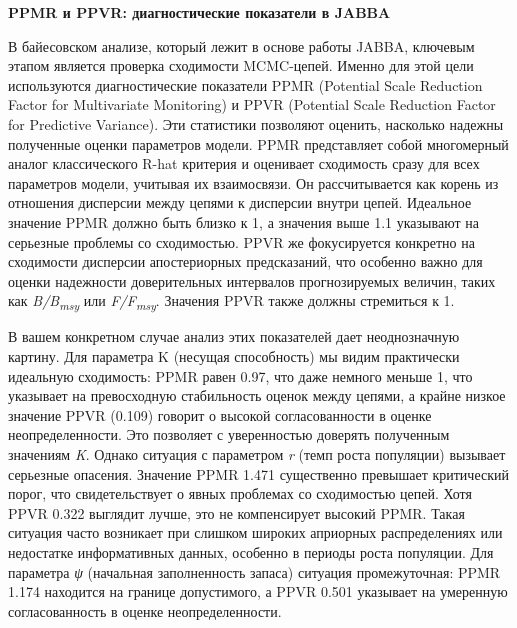 \documentclass[
  letterpaper,
  DIV=11,
  numbers=noendperiod]{scrreprt}
\begin{document}
\textbf{PPMR и PPVR: диагностические показатели в JABBA}

В байесовском анализе, который лежит в основе работы JABBA, ключевым
этапом является проверка сходимости MCMC-цепей. Именно для этой цели
используются диагностические показатели PPMR (Potential Scale Reduction
Factor for Multivariate Monitoring) и PPVR (Potential Scale Reduction
Factor for Predictive Variance). Эти статистики позволяют оценить,
насколько надежны полученные оценки параметров модели. PPMR представляет
собой многомерный аналог классического R-hat критерия и оценивает
сходимость сразу для всех параметров модели, учитывая их взаимосвязи. Он
рассчитывается как корень из отношения дисперсии между цепями к
дисперсии внутри цепей. Идеальное значение PPMR должно быть близко к 1,
а значения выше 1.1 указывают на серьезные проблемы со сходимостью. PPVR
же фокусируется конкретно на сходимости дисперсии апостериорных
предсказаний, что особенно важно для оценки надежности доверительных
интервалов прогнозируемых величин, таких как
\emph{B/B\textsubscript{msy}} или \emph{F/F\textsubscript{msy}}.
Значения PPVR также должны стремиться к 1.

В вашем конкретном случае анализ этих показателей дает неоднозначную
картину. Для параметра K (несущая способность) мы видим практически
идеальную сходимость: PPMR равен 0.97, что даже немного меньше 1, что
указывает на превосходную стабильность оценок между цепями, а крайне
низкое значение PPVR (0.109) говорит о высокой согласованности в оценке
неопределенности. Это позволяет с уверенностью доверять полученным
значениям \emph{K}. Однако ситуация с параметром \emph{r} (темп роста
популяции) вызывает серьезные опасения. Значение PPMR 1.471 существенно
превышает критический порог, что свидетельствует о явных проблемах со
сходимостью цепей. Хотя PPVR 0.322 выглядит лучше, это не компенсирует
высокий PPMR. Такая ситуация часто возникает при слишком широких
априорных распределениях или недостатке информативных данных, особенно в
периоды роста популяции. Для параметра \emph{ψ} (начальная заполненность
запаса) ситуация промежуточная: PPMR 1.174 находится на границе
допустимого, а PPVR 0.501 указывает на умеренную согласованность в
оценке неопределенности.
\end{document}
